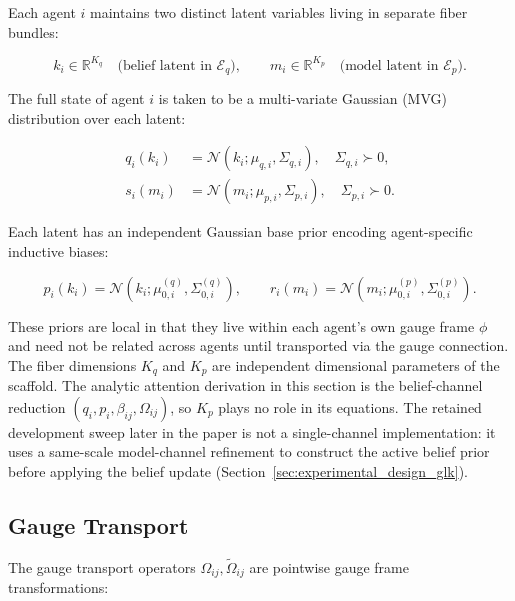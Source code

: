 \documentclass[twoside,11pt]{article}
\begin{document}
Each agent $i$ maintains two distinct latent variables living in separate fiber bundles:

\begin{equation}
k_i \in \mathbb{R}^{K_q} \quad \text{(belief latent in $\mathcal{E}_q$)},
\qquad
m_i \in \mathbb{R}^{K_p} \quad \text{(model latent in $\mathcal{E}_p$)}.
\label{eq:dual_latents}
\end{equation}

The full state of agent $i$ is taken to be a multi-variate Gaussian (MVG) distribution over each latent:

\begin{equation}
\begin{aligned}
q_i(k_i) &= \mathcal{N}(k_i ;\mu_{q,i}, \Sigma_{q,i}),
\quad \Sigma_{q,i} \succ 0,\\
s_i(m_i) &= \mathcal{N}(m_i ;\mu_{p,i}, \Sigma_{p,i}),
\quad \Sigma_{p,i} \succ 0.
\end{aligned}
\label{eq:gaussian_states}
\end{equation}

Each latent has an independent Gaussian base prior encoding agent-specific inductive biases:

\begin{equation}
p_i(k_i) = \mathcal{N}(k_i ; \mu_{0,i}^{(q)}, \Sigma_{0,i}^{(q)}),
\qquad
r_i(m_i) = \mathcal{N}(m_i ; \mu_{0,i}^{(p)}, \Sigma_{0,i}^{(p)}).
\label{eq:base_priors}
\end{equation}

These priors are local in that they live within each agent's own gauge frame $\phi$ and need not be related across agents until transported via the gauge connection. The fiber dimensions $K_q$ and $K_p$ are independent dimensional parameters of the scaffold. The analytic attention derivation in this section is the belief-channel reduction $(q_i,p_i,\beta_{ij},\Omega_{ij})$, so $K_p$ plays no role in its equations. The retained development sweep later in the paper is not a single-channel implementation: it uses a same-scale model-channel refinement to construct the active belief prior before applying the belief update (Section~\ref{sec:experimental_design_glk}).

\subsection{Gauge Transport}

The gauge transport operators $\Omega_{ij}, \tilde{\Omega}_{ij}$ are pointwise gauge frame transformations:
\end{document}
